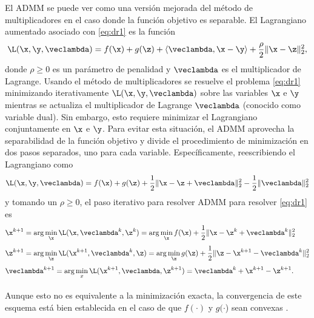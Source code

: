 	El ADMM se puede ver como una versión mejorada del método de multiplicadores en el caso donde la función objetivo es separable. El Lagrangiano aumentado asociado con \eqref{eq:dr1} es la función 
	\begin{equation}
		\L(\x,\y,\veclambda) = f(\x) + g(\z) +\langle\veclambda,\x-\y\rangle + \frac{\rho}{2}\|\x-\z\|^2_2,
		\label{eq:dr2}
	\end{equation}
	donde $\rho\ge 0$ es un parámetro de penalidad y $\veclambda$ es el multiplicador de Lagrange. Usando el método de multiplicadores se resuelve el problema \eqref{eq:dr1} minimizando iterativamente $\L(\x,\y,\veclambda)$ sobre las variables $\x$ e $\y$ mientras se actualiza el multiplicador de Lagrange $\veclambda$ (conocido como variable dual). Sin embargo, esto requiere minimizar el Lagrangiano conjuntamente en $\x$ e $\y$. Para evitar esta situación, el ADMM aprovecha la separabilidad de la función objetivo y divide el procedimiento de minimización en dos pasos separados, uno para cada variable.  Específicamente, reescribiendo el Lagrangiano como
	\begin{equation}
		\L(\x,\y,\veclambda) = f(\x) + g(\z) +\frac{1}{2}\|\x-\z+\veclambda\|_2^2 - \frac{1}{2}\|\veclambda\|_2^2
		\label{eq:dr4}
	\end{equation}
	y tomando un $\rho \ge 0$, el paso iterativo para resolver ADMM para resolver \eqref{eq:dr1} es
	\begin{equation}
		\begin{aligned}
			& \x^{k+1} = \arg\min_{\x}\L(\x,\veclambda^k,\z^k) = \arg\min_{\x} f(\x) + \frac{1}{2}\|\x - \z^k + \veclambda^k\|_2^2 \\[0.3em]
			& \z^{k+1} = \arg\min_{\z}\L(\x^{k+1},\veclambda^k,\z) = \arg\min_{\z} g(\z) + \frac{1}{2}\|\z - \x^{k+1}-\veclambda^k\|_2^2 \\[0.3em]
			& \veclambda^{k+1} = \arg\min_{x}\L(\x^{k+1},\veclambda,\z^{k+1}) = \veclambda^k + \x^{k+1}-\z^{k+1}. \\[0.3em]
		\end{aligned}
		\label{eq:dr5}
	\end{equation}
	
	Aunque esto no es equivalente a la minimización exacta, la convergencia de este esquema está bien establecida en el caso de que $f(\cdot)$ y $g(\cdot$) sean convexas \cite{Parikh2014}.
	
	
	
	
